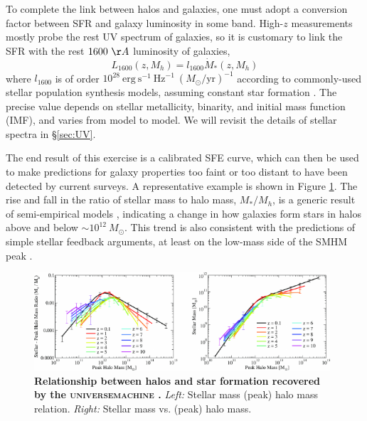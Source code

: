 To complete the link between halos and galaxies, one must adopt a conversion factor between SFR and galaxy luminosity in some band. High-$z$ measurements mostly probe the rest UV spectrum of galaxies, so it is customary to link the SFR with the rest $1600 \ \AA$ luminosity of galaxies,
\begin{equation}
	L_{1600}(z, M_h) = l_{1600} \dot{M}_{\ast}(z,M_h)
\end{equation}
where $l_{1600}$ is of order $10^{28} \ \mathrm{erg} \ \mathrm{s}^{-1} \ \mathrm{Hz}^{-1} \ (M_{\odot} / \mathrm{yr})^{-1}$ according to commonly-used stellar population synthesis models, assuming constant star formation \cite{Leitherer1999,Eldridge2009,Conroy2009}. The precise value depends on stellar metallicity, binarity, and initial mass function (IMF), and varies from model to model. We will revisit the details of stellar spectra in \S\ref{sec:UV}.

The end result of this exercise is a calibrated SFE curve, which can then be used to make predictions for galaxy properties too faint or too distant to have been detected by current surveys. A representative example \cite{Behroozi2019} is shown in Figure \ref{fig:universe_machine}. The rise and fall in the ratio of stellar mass to halo mass, $M_{\ast} / M_h$, is a generic result of semi-empirical models \cite{Trenti2010,Mason2015,Sun2016,Mashian2016,Tacchella2018}, indicating a change in how galaxies form stars in halos above and below $\sim 10^{12} \ M_{\odot}$. This trend is also consistent with the predictions of simple stellar feedback arguments, at least on the low-mass side of the SMHM peak \cite{Dayal2014,Furlanetto2017}.

\begin{figure}[]
\begin{center}
\includegraphics[width=0.98\textwidth]{Mirocha/behroozi2019_fig9.pdf}
\end{center}
\caption{{\bf Relationship between halos and star formation recovered by the \textsc{universemachine} \cite{Behroozi2019}.} \textit{Left:} Stellar mass (peak) halo mass relation. \textit{Right:} Stellar mass vs. (peak) halo mass.}
\label{fig:universe_machine}
\end{figure}

